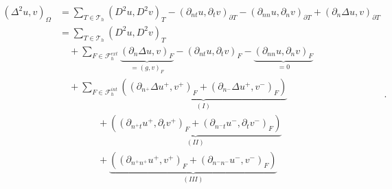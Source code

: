 \begin{equation*}
    \begin{split}
 \left( \Delta  ^{2} u,v \right) _{\Omega } & =\sum_{T\in \mathcal{T} _{h}}^{} \left( D^2u,D^2v \right) _{T } - \left(\partial _{nt} u, \partial _{t}v
\right)_{\partial T} - \left(\partial _{nn} u, \partial _{n}v \right)_{\partial T} + \left(\partial _{n} \Delta  u,v
\right)_{\partial T} \\
&= \sum_{T\in \mathcal{T} _{h}}^{} \left( D^2u,D^2v \right) _{T } \\
&  \quad + \sum_{F \in \mathcal{F}_{h}^{ext} }^{} \underbrace{\left( \partial _{n} \Delta  u, v  \right)_{F}}_{= \left( g,v \right)_{F} }  -  \left(
\partial _{nt} u, \partial _{t} v \right) _{F}  - \underbrace{\left( \partial _{nn} u, \partial _{n} v \right)_{F}}_{ = 0}    \\
& \quad  + \sum_{F \in \mathcal{F} _{h}^{int}}^{} \underbrace{\left( \left(\partial _{n^{+}} \Delta  u^{+}
        ,v^{+}\right)_{F}
+ \left(\partial _{n^{-}} \Delta  u^{+} ,v^{-}\right)_{F}  \right)}_{(I)} \\
 & \quad \quad \quad  \quad +
\underbrace{\left( \left(\partial _{n^{+}t} u^{+}, \partial_{t} v^{+} \right)_{F} +  \left(\partial _{n^{-}t} u^{-},
        \partial_{t} v^{-}
\right)_{F}  \right) }_{(II)} \\
 & \quad \quad \quad  \quad  +
\underbrace{\left( \left(\partial _{n^{+}n^{+}} u^{+}, v^{+} \right) _{F} + \left(\partial _{n^{-}n^{-}} u^{-}, v^{-}
\right) _{F} \right) }_{(III)}
    \end{split}
.\end{equation*}

